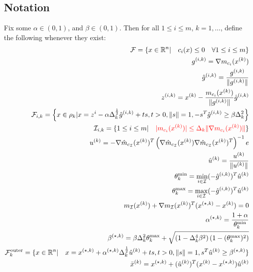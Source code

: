
\newcommand{\gik}{{g^{(i, k)}}}
\newcommand{\hgik}{{{\hat g}^{(i, k)}}}
\newcommand{\zik}{{z^{(i, k)}}}
\newcommand{\fik}{{\mathcal F_{i, k}}}
\newcommand{\iik}{{\mathcal I_{i, k}}}
\newcommand{\uk}{{u^{(k)}}}
\newcommand{\huk}{{{\hat u}^{(k)}}}
\newcommand{\ask}{{\alpha^{(\star, k)}}}
\newcommand{\bsk}{{\beta^{(\star, k)}}}
\newcommand{\fcko}{{\mathcal {F}^{\text{outer}}_k}}
\newcommand{\rn}{{\mathbb R^{n}}}
\newcommand{\xsk}{{x^{(\star, k)}}}
\newcommand{\bxk}{{\bar{x}^{(k)}}}
\newcommand{\f}{{\mathcal F}}

\subsection{Notation}

Fix some $\alpha \in (0, 1)$, and $\beta \in (0, 1)$.
Then for all $1 \le i \le m$, $k = 1, \ldots$, define the following whenever they exist:
\begin{align*}
\f = \{x \in \rn | \quad c_i(x) \le 0\quad \forall 1 \le i \le m \} \\
\gik = \nabla m_{c_i}(\xk) \\ 
\hgik = \frac{\gik}{\|\gik\|} \\
\zik = \xk - \frac{m_{c_i}(\xk)}{\|\gik\|}\hgik \\
\fik = \left\{x \in \rk | x = z^i - \alpha \dk^{\frac 1 2}\hgik + t s,t > 0, \|s\| = 1, -s^T\hgik \ge \beta \dk^2\right\} \\
\iik = \{1\le i \le m | \quad\color{red} |m_{c_i}(\xk)| \le \dk\|\nabla m_{c_i}(\xk)\|\color{black}\} \\
\uk = -\nabla \hat m_{c_{\mathcal I}}(\xk)^T\left(\nabla \hat m_{c_{\mathcal I}}(\xk)\nabla \hat m_{c_{\mathcal I}}(\xk)^T\right)^{-1} e\\
\huk = \frac {\uk} {\| \uk\|}\\
\theta^{\text{min}}_k = \min_{i \in \mathcal I} (-\hgik)^T \huk \\
\theta^{\text{max}}_k = \max_{i \in \mathcal I} (-\hgik)^T \huk \\
m_{\mathcal I}(\xk) + \nabla m_{\mathcal I}(\xk)^T (\xsk - \xk) = 0 \\
\ask = \frac{1 + \alpha}{\theta^{\text{min}}_k} \\
\bsk = \beta\dk^2 \theta^{\text{max}}_k + \sqrt{(1 - \dk^4\beta^2)\left(1 - (\theta^{\text{max}}_k) ^2\right)} \\
\fcko = \{x \in \rn | \quad x = \xsk + \ask\dk^{\frac 1 2}\huk + ts, t > 0, \|s\| = 1, s^T\huk \ge \bsk \} \\
\bxk = \xsk + (\huk)^T(\xk - \xsk)\huk\\
\end{align*}

